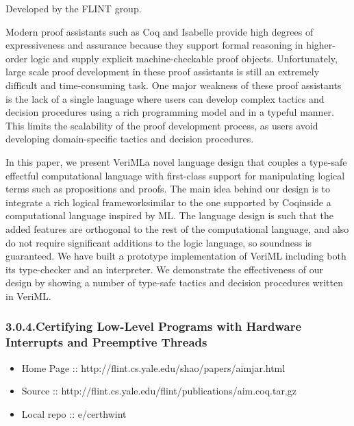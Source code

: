 \documentclass[12pt,twoside]{article}
\begin{document}
\noindent{}Developed by the FLINT group.%

Modern proof assistants such as Coq and Isabelle provide high degrees
of expressiveness and assurance because they support formal reasoning
in higher-order logic and supply explicit machine-checkable proof
objects. Unfortunately, large scale proof development in these proof
assistants is still an extremely difficult and time-consuming
task. One major weakness of these proof assistants is the lack of a
single language where users can develop complex tactics and decision
procedures using a rich programming model and in a typeful
manner. This limits the scalability of the proof development process,
as users avoid developing domain-specific tactics and decision
procedures.%

In this paper, we present VeriML\textemdash{}a novel language design that
couples a type-safe effectful computational language with first-class
support for manipulating logical terms such as propositions and
proofs. The main idea behind our design is to integrate a rich logical
framework\textemdash{}similar to the one supported by Coq\textemdash{}inside a
computational language inspired by ML. The language design is such
that the added features are orthogonal to the rest of the
computational language, and also do not require significant additions
to the logic language, so soundness is guaranteed. We have built a
prototype implementation of VeriML including both its type-checker and
an interpreter. We demonstrate the effectiveness of our design by
showing a number of type-safe tactics and decision procedures written
in VeriML.%

\subsubsection{3.0.4.\hspace*{0.5em}Certifying Low-Level Programs with Hardware Interrupts and Preemptive Threads}\label{sec-certifying-low-level-programs-with-hardware-interrupts-and-preemptive-threads}%

\begin{itemize}[noitemsep,topsep=\mdcompacttopsep]%

\item{}Home Page :: http://flint.cs.yale.edu/shao/papers/aimjar.html%

\item{}Source :: http://flint.cs.yale.edu/flint/publications/aim.coq.tar.gz%

\item{}Local repo :: e/certhwint%
\end{itemize}%
\end{document}
